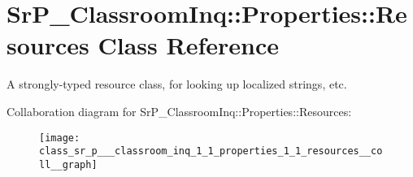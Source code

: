 \hypertarget{class_sr_p___classroom_inq_1_1_properties_1_1_resources}{
\section{\-Sr\-P\-\_\-\-Classroom\-Inq\-:\-:\-Properties\-:\-:\-Resources \-Class \-Reference}
\label{class_sr_p___classroom_inq_1_1_properties_1_1_resources}
}


\-A strongly-\/typed resource class, for looking up localized strings, etc.  




\-Collaboration diagram for \-Sr\-P\-\_\-\-Classroom\-Inq\-:\-:\-Properties\-:\-:\-Resources\-:
\nopagebreak
\begin{figure}[H]
\begin{center}
\leavevmode
\texttt{[image: class\_sr\_p\_\_\_classroom\_inq\_1\_1\_properties\_1\_1\_resources\_\_coll\_\_graph]}
\end{center}
\end{figure}
